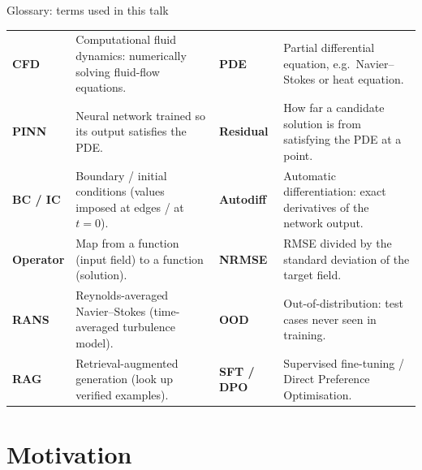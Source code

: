 \documentclass[aspectratio=169,10pt]{beamer}
\begin{document}
\begin{frame}{Glossary: terms used in this talk}
\small
\renewcommand{\arraystretch}{1.15}
\begin{tabularx}{\textwidth}{>{\bfseries}l L >{\bfseries}l L}
\toprule
CFD & Computational fluid dynamics: numerically solving fluid-flow equations. &
PDE & Partial differential equation, e.g.\ Navier--Stokes or heat equation.\\
PINN & Neural network trained so its output satisfies the PDE. &
Residual & How far a candidate solution is from satisfying the PDE at a point.\\
BC / IC & Boundary / initial conditions (values imposed at edges / at $t=0$). &
Autodiff & Automatic differentiation: exact derivatives of the network output.\\
Operator & Map from a function (input field) to a function (solution). &
NRMSE & RMSE divided by the standard deviation of the target field.\\
RANS & Reynolds-averaged Navier--Stokes (time-averaged turbulence model). &
OOD & Out-of-distribution: test cases never seen in training.\\
RAG & Retrieval-augmented generation (look up verified examples). &
SFT / DPO & Supervised fine-tuning / Direct Preference Optimisation.\\
\bottomrule
\end{tabularx}
\end{frame}

\section{Motivation}
\end{document}
